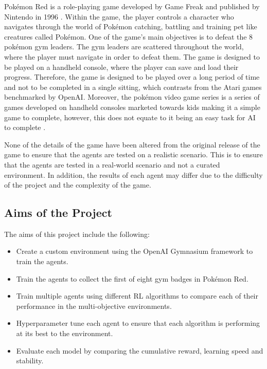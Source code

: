 Pokémon Red is a role-playing game developed by Game Freak and published by Nintendo in 1996 \cite{HubZ_1998}. Within the game, the player controls a character who navigates through the world of Pokémon catching, battling and training pet like creatures called Pokémon. One of the game's main objectives is to defeat the 8 pokémon gym leaders. The gym leaders are scattered throughout the world, where the player must navigate in order to defeat them. The game is designed to be played on a handheld console, where the player can save and load their progress. Therefore, the game is designed to be played over a long period of time and not to be completed in a single sitting, which contrasts from the Atari games benchmarked by OpenAI. Moreover, the pokémon video game series is a series of games developed on handheld consoles marketed towards kids making it a simple game to complete, however, this does not equate to it being an easy task for AI to complete \cite{HubZ_1998}. 

None of the details of the game have been altered from the original release of the game to ensure that the agents are tested on a realistic scenario. This is to ensure that the agents are tested in a real-world scenario and not a curated environment. In addition, the results of each agent may differ due to the difficulty of the project and the complexity of the game.  

\subsection{Aims of the Project}

The aims of this project include the following:

\begin{itemize}
    \item Create a custom environment using the OpenAI Gymnasium framework to train the agents.
    \item Train the agents to collect the first of eight gym badges in Pokémon Red.
    \item Train multiple agents using different RL algorithms to compare each of their performance in the multi-objective environments.
    \item Hyperparameter tune each agent to ensure that each algorithm is performing at its best to the environment.
    \item Evaluate each model by comparing the cumulative reward, learning speed and stability.

\end{itemize}

